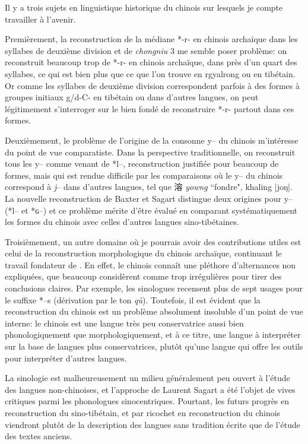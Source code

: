 \documentclass[oldfontcommands,oneside,a4paper,11pt]{memoir}
\newcommand{\ipa}[1]{{\phon #1}} %
\newcommand{\zh}[1]{{\cn #1}}
\begin{document}
 
Il y a trois sujets en linguistique historique du chinois sur lesquels je compte travailler à l'avenir.

Premièrement,   la reconstruction de la médiane *-r- en chinois archaïque dans les syllabes de deuxième division et de \textit{chongniu} 3 me semble poser problème: on reconstruit beaucoup trop de *-r- en chinois archaïque, dans près d'un quart des syllabes, ce qui est bien plus que ce que l'on trouve en rgyalrong ou en tibétain. Or comme les syllabes de deuxième division correspondent parfois à des formes à groupes initiaux g/d-C- en tibétain ou dans d'autres langues, on peut légitimement s'interroger sur le bien fondé de reconstruire *-r- partout dans ces formes. 

Deuxièmement, le problème de l'origine de la consonne \ipa{y--} du chinois m'intéresse du point de vue comparatiste. Dans la perspective traditionnelle, on reconstruit tous les y-- comme venant de *l--, reconstruction justifiée pour beaucoup de formes, mais qui est rendue difficile par les comparaisons où le \ipa{y--} du chinois correspond  à \textit{j}-- dans d'autres langues, tel que \zh{溶} \textit{yowng} ``fondre", khaling |joŋ|.  La nouvelle reconstruction de Baxter et Sagart distingue deux origines pour \ipa{y--} (*l-- et *ɢ--) et ce problème mérite d'être évalué en comparant systématiquement les formes du chinois avec celles d'autres langues sino-tibétaines.


Troisièmement, un autre domaine où je pourrais avoir des contributions utiles est celui de la reconstruction morphologique du chinois archaïque, continuant le travail fondateur de \citet{sagart99roc}. En effet, le chinois connaît une pléthore d'alternances non expliquées, que beaucoup   considèrent   comme trop irrégulières pour tirer des conclusions claires. Par exemple, les sinologues recensent plus de sept usages pour le suffixe *--s (dérivation par le ton \textit{qù}). Toutefois, il est évident que la reconstruction du chinois est un problème absolument insoluble d'un point de vue interne: le chinois est une langue très peu conservatrice aussi bien phonologiquement que morphologiquement, et à ce titre, une langue à interpréter sur la base de langues plus conservatrices, plutôt qu'une langue qui offre les outils pour interpréter d'autres langues. 

La sinologie est malheureusement un milieu généralement peu ouvert à l'étude des langues non-chinoises, et l'approche de Laurent Sagart a été l'objet de vives critiques parmi les phonologues sinocentriques.   Pourtant, les futurs  progrès en reconstruction du sino-tibétain, et par ricochet en reconstruction du chinois viendront plutôt de la description des langues sans tradition écrite que de l'étude des textes anciens. 
 
\end{document}
